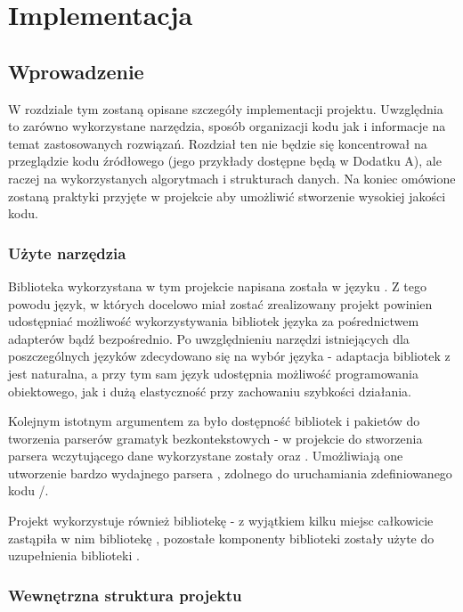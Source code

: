 \documentclass[polish]{standalone}
\begin{document}
\pagestyle{headings}

\chapter{Implementacja}

\section{Wprowadzenie}

W rozdziale tym zostaną opisane szczegóły implementacji projektu. Uwzględnia to zarówno wykorzystane narzędzia, sposób
organizacji kodu jak i informacje na temat zastosowanych rozwiązań. Rozdział ten nie będzie się koncentrował na
przeglądzie kodu źródłowego (jego przykłady dostępne będą w Dodatku A), ale raczej na wykorzystanych algorytmach i
strukturach danych. Na koniec omówione zostaną praktyki przyjęte w projekcie aby umożliwić stworzenie wysokiej jakości
kodu.

\subsection{Użyte narzędzia}

Biblioteka  wykorzystana w tym projekcie napisana została w języku . Z tego powodu język, w których
docelowo miał zostać zrealizowany projekt powinien udostępniać możliwość wykorzystywania bibliotek języka  za
pośrednictwem adapterów bądź bezpośrednio. Po uwzględnieniu narzędzi istniejących dla poszczególnych języków zdecydowano
się na wybór języka  - adaptacja bibliotek z  jest naturalna, a przy tym sam język udostępnia
możliwość programowania obiektowego, jak i dużą elastyczność przy zachowaniu szybkości działania.

Kolejnym istotnym argumentem za  było dostępność bibliotek i pakietów do tworzenia parserów gramatyk
bezkontekstowych - w projekcie do stworzenia parsera wczytującego dane wykorzystane zostały  oraz
. Umożliwiają one utworzenie bardzo wydajnego parsera , zdolnego do uruchamiania
zdefiniowanego kodu /.

Projekt wykorzystuje również bibliotekę  - z wyjątkiem kilku miejsc  całkowicie
zastąpiła w nim bibliotekę , pozostałe komponenty biblioteki  zostały użyte do uzupełnienia
biblioteki .

\subsection{Wewnętrzna struktura projektu}
\end{document}
